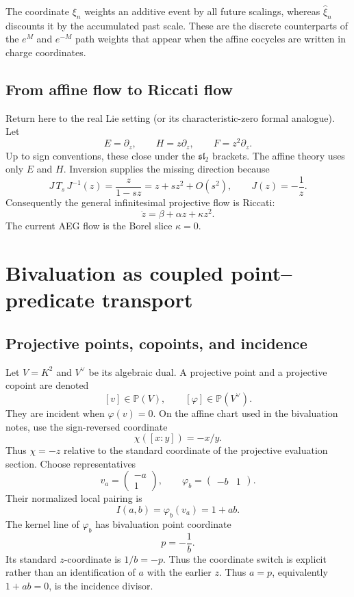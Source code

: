 \documentclass[11pt]{article}
\theoremstyle{definition}
\theoremstyle{remark}
\newcommand{\PP}{\mathbb P}
\begin{document}
The coordinate \(\xi_n\) weights an additive event by all future scalings,
whereas \(\widehat\xi_n\) discounts it by the accumulated past scale.  These
are the discrete counterparts of the \(e^{M}\) and \(e^{-M}\) path weights
that appear when the affine cocycles are written in charge coordinates.

\subsection{From affine flow to Riccati flow}

Return here to the real Lie setting (or its characteristic-zero formal
analogue).  Let
\[
E=\partial_z,\qquad H=z\partial_z,\qquad F=z^2\partial_z.
\]
Up to sign conventions, these close under the \(\mathfrak{sl}_2\) brackets.
The affine theory uses only \(E\) and \(H\).  Inversion supplies the missing
direction because
\[
J\,T_s\,J^{-1}(z)=\frac{z}{1-sz}
=z+s z^2+O(s^2),
\qquad J(z)=-\frac1z.
\]
Consequently the general infinitesimal projective flow is Riccati:
\begin{equation}
\dot z=\beta+\alpha z+\kappa z^2.
\label{eq:riccati-general}
\end{equation}
The current AEG flow is the Borel slice \(\kappa=0\).

\section{Bivaluation as coupled point--predicate transport}

\subsection{Projective points, copoints, and incidence}

Let \(V=K^2\) and \(V^\vee\) be its algebraic dual.  A projective point and a
projective copoint are denoted
\[
[v]\in\PP(V),\qquad [\varphi]\in\PP(V^\vee).
\]
They are incident when \(\varphi(v)=0\).  On the affine chart used in the
bivaluation notes, use the sign-reversed coordinate
\[
\chi([x:y])=-x/y.
\]
Thus \(\chi=-z\) relative to the standard coordinate of the projective
evaluation section.  Choose representatives
\[
v_a=\begin{pmatrix}-a\\1\end{pmatrix},
\qquad
\varphi_b=\begin{pmatrix}-b&1\end{pmatrix}.
\]
Their normalized local pairing is
\[
I(a,b)=\varphi_b(v_a)=1+ab.
\]
The kernel line of \(\varphi_b\) has bivaluation point coordinate
\[
p=-\frac1b.
\]
Its standard \(z\)-coordinate is \(1/b=-p\).  Thus the coordinate switch is
explicit rather than an identification of \(a\) with the earlier \(z\).
Thus \(a=p\), equivalently \(1+ab=0\), is the incidence divisor.
\end{document}
